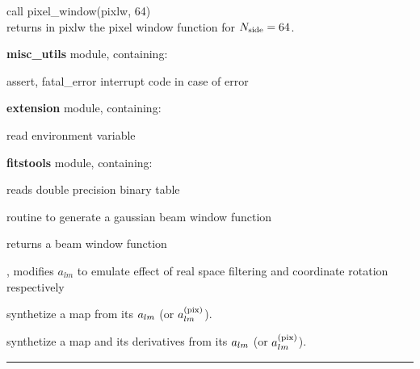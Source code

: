 \begin{example}
{
call pixel\_window(pixlw, 64)  \\
}
{
returns in pixlw the pixel window function for ${N_{\rm side}} = 64$.
}
\end{example}

\begin{modules}
  \begin{sulist}{} %
  \item[\textbf{misc\_utils}] module, containing:
      \item[assert, fatal\_error] interrupt code in case of error
  \item[\textbf{extension}] module, containing:
     \item[\htmlref{getEnvironment}{sub:getenvironment}] read environment variable
  \item[\textbf{fitstools}] module, containing:
     \item[\htmlref{read\_dbintab}{sub:read_dbintab}] reads double precision binary table
  \end{sulist}
\end{modules}

\begin{related}
  \begin{sulist}{} %
  \item[\htmlref{gaussbeam}{sub:gaussbeam}] routine to generate a gaussian
beam window function
  \item[\htmlref{generate\_beam}{sub:generate_beam}] returns a beam window function
  \item[\htmlref{alter\_alm}{sub:alter_alm}, \htmlref{rotate\_alm}{sub:rotate_alm}] modifies $a_{lm}$ to emulate effect
of real space filtering and coordinate rotation respectively
  \item[\htmlref{alm2map}{sub:alm2map}] synthetize a \healpix map from its $a_{lm}$
(or $a_{lm}^{\rm (pix)}$).
  \item[\htmlref{alm2map\_der}{sub:alm2map_der}] synthetize a map and its
derivatives from its $a_{lm}$ (or $a_{lm}^{\rm (pix)}$).
  \end{sulist}
\end{related}

\rule{\hsize}{2mm}

\newpage
